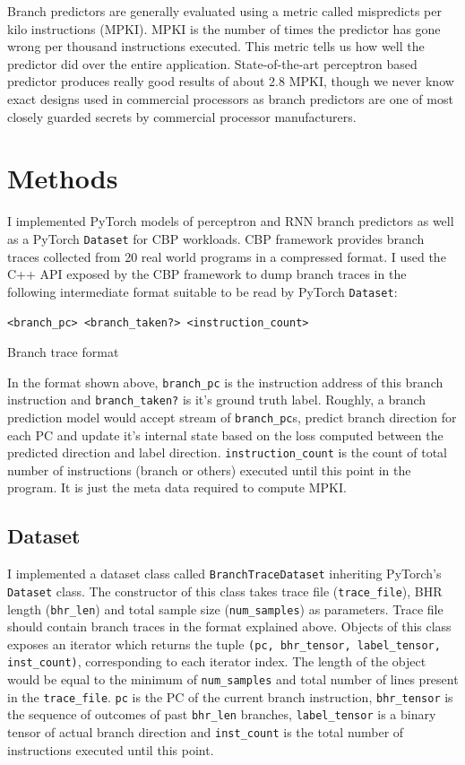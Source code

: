 \documentclass{article}
\begin{document}
Branch predictors are generally evaluated using a metric called mispredicts per kilo instructions (MPKI). MPKI is the number of times the predictor has gone wrong per thousand instructions executed. This metric tells us how well the predictor did over the entire application. State-of-the-art perceptron based predictor produces really good results of about 2.8 MPKI, though we never know exact designs used in commercial processors as branch predictors are one of most closely guarded secrets by commercial processor manufacturers.

\section{Methods}
I implemented PyTorch models of perceptron and RNN branch predictors as well as a PyTorch \verb+Dataset+ for CBP workloads. CBP framework provides branch traces collected from 20 real world programs in a compressed format. I used the C++ API exposed by the CBP framework to dump branch traces in the following intermediate format suitable to be read by PyTorch \verb+Dataset+:

\begin{center}
\verb+<branch_pc> <branch_taken?> <instruction_count>+

Branch trace format
\end{center}

In the format shown above, \verb+branch_pc+ is the instruction address of this branch instruction and \verb+branch_taken?+ is it's ground truth label. Roughly, a branch prediction model would accept stream of \verb+branch_pc+s, predict branch direction for each PC and update it's internal state based on the loss computed between the predicted direction and label direction. \verb+instruction_count+ is the count of total number of instructions (branch or others) executed until this point in the program. It is just the meta data required to compute MPKI.

\subsection{Dataset}
I implemented a dataset class called \verb+BranchTraceDataset+ inheriting PyTorch's \verb+Dataset+ class. The constructor of this class takes trace file (\verb+trace_file+), BHR length (\verb+bhr_len+) and total sample size (\verb+num_samples+) as parameters. Trace file should contain branch traces in the format explained above. Objects of this class exposes an iterator which returns the tuple \verb+(pc, bhr_tensor, label_tensor, inst_count)+, corresponding to each iterator index. The length of the object would be equal to the minimum of \verb+num_samples+ and total number of lines present in the \verb+trace_file+. \verb+pc+ is the PC of the current branch instruction, \verb+bhr_tensor+ is the sequence of outcomes of past \verb+bhr_len+ branches, \verb+label_tensor+ is a binary tensor of actual branch direction and \verb+inst_count+ is the total number of instructions executed until this point.
\end{document}
